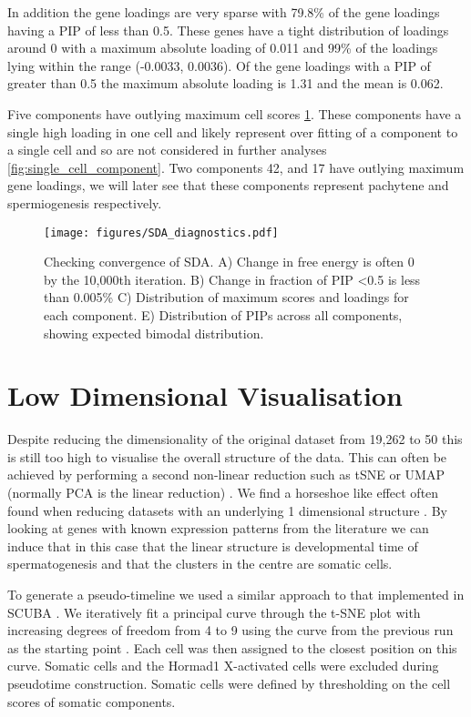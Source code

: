 In addition the gene loadings are very sparse with 79.8\% of the gene loadings having a PIP of less than 0.5. These genes have a tight distribution of loadings around 0 with a maximum absolute loading of 0.011 and 99\% of the loadings lying within the range (-0.0033, 0.0036). Of the gene loadings with a PIP of greater than 0.5 the maximum absolute loading is 1.31 and the mean is 0.062.

Five components have outlying maximum cell scores \ref{fig:SDA_diagnostics}. These components have a single high loading in one cell and likely represent over fitting of a component to a single cell and so are not considered in further analyses \ref{fig:single_cell_component}. Two components 42, and 17 have outlying maximum gene loadings, we will later see that these components represent pachytene and spermiogenesis respectively. 

\begin{figure}[H]
	\centering
	\texttt{[image: figures/SDA\_diagnostics.pdf]}
	\caption{Checking convergence of SDA. A) Change in free energy is often 0 by the 10,000th iteration. B) Change in fraction of PIP <0.5 is less than 0.005\% C) Distribution of maximum scores and loadings for each component. E) Distribution of PIPs across all components, showing expected bimodal distribution.}
	\label{fig:SDA_diagnostics}
\end{figure}

\section{Low Dimensional Visualisation}

Despite reducing the dimensionality of the original dataset from 19,262 to 50 this is still too high to visualise the overall structure of the data. This can often be achieved by performing a second non-linear reduction such as tSNE or UMAP (normally PCA is the linear reduction) \cite{Maaten2008Visualizing, McInnes2018UMAPa, Becht2018Dimensionality}. We find a horseshoe like effect often found when reducing datasets with an underlying 1 dimensional structure \cite{Novembre2008Interpreting, Podani2002RESEMBLANCE}. By looking at genes with known expression patterns from the literature we can induce that in this case that the linear structure is developmental time of spermatogenesis and that the clusters in the centre are somatic cells.

To generate a pseudo-timeline we used a similar approach to that implemented in SCUBA \cite{Marco2014Bifurcation}. We iteratively fit a principal curve through the t-SNE plot with increasing degrees of freedom from 4 to 9 using the curve from the previous run as the starting point \cite{Hastie1989Principal}. Each cell was then assigned to the closest position on this curve. Somatic cells and the Hormad1 X-activated cells were excluded during pseudotime construction. Somatic cells were defined by thresholding on the cell scores of somatic components.


